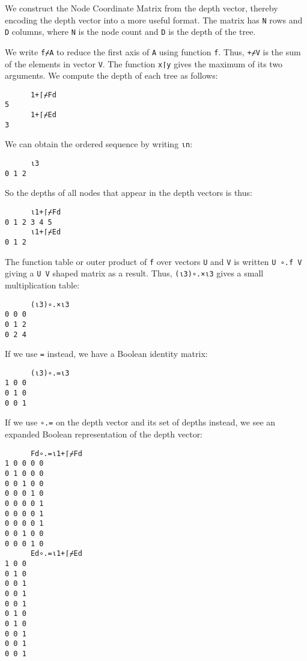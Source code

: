\documentclass[numbers,9pt]{sigplanconf}
\begin{document}
We construct the Node Coordinate Matrix from the depth vector, thereby encoding 
the depth vector into a more useful format. The matrix has \verb;N; rows and 
\verb;D; columns, where \verb;N; is the node count and \verb;D; is the depth 
of the tree.

We write \verb;f⌿A; to reduce the first axis of \verb;A; using function \verb;f;. Thus,
\verb;+⌿V; is the sum of the elements in vector \verb;V;. The function \verb;x⌈y;
gives the maximum of its two arguments.
We compute the depth of each tree as follows:

\begin{verbatim}
      1+⌈⌿Fd
5
      1+⌈⌿Ed
3
\end{verbatim}

\noindent
We can obtain the ordered sequence  by writing \verb;⍳n;:

\begin{verbatim}
      ⍳3
0 1 2
\end{verbatim}

\noindent
So the depths of all nodes that appear in the depth vectors is thus:

\begin{verbatim}
      ⍳1+⌈⌿Fd
0 1 2 3 4 5
      ⍳1+⌈⌿Ed
0 1 2
\end{verbatim}

\noindent
The function table or outer product of \verb;f; over vectors \verb;U; and \verb;V; is
written \verb;U ∘.f V; giving a \verb;U V; shaped matrix as a result. Thus,
\verb;(⍳3)∘.×⍳3; gives a small multiplication table:

\begin{verbatim}
      (⍳3)∘.×⍳3
0 0 0
0 1 2
0 2 4
\end{verbatim}

\noindent
If we use \verb;=; instead, we have a Boolean identity matrix:

\begin{verbatim}
      (⍳3)∘.=⍳3
1 0 0
0 1 0
0 0 1
\end{verbatim}

\noindent
If we use \verb;∘.=; on the depth vector and its set of depths instead,
we see an expanded Boolean representation of the depth vector:

\begin{verbatim}
      Fd∘.=⍳1+⌈⌿Fd
1 0 0 0 0
0 1 0 0 0
0 0 1 0 0
0 0 0 1 0
0 0 0 0 1
0 0 0 0 1
0 0 0 0 1
0 0 1 0 0
0 0 0 1 0
      Ed∘.=⍳1+⌈⌿Ed
1 0 0
0 1 0
0 0 1
0 0 1
0 0 1
0 1 0
0 1 0
0 0 1
0 0 1
0 0 1
\end{verbatim}
\end{document}

